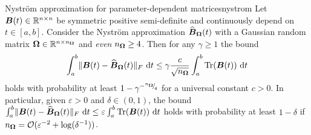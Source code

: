 \color{blue}

\begin{lemma}{Nyström approximation for parameter-dependent matrices}{nystrom}
    Let $\boldsymbol{B}(t) \in \mathbb{R}^{n \times n}$ be symmetric positive semi-definite and continuously depend on $t \in [a, b]$. Consider the Nyström approximation $\widehat{\boldsymbol{B}}_{\boldsymbol{\Omega}}(t)$ with a Gaussian random matrix $\boldsymbol{\Omega} \in \mathbb{R}^{n \times n_{\boldsymbol{\Omega}}}$ and \emph{even} $n_{\boldsymbol{\Omega}} \geq 4$.
    Then for any $\gamma \geq 1$ the bound
    \begin{equation}
        \int_{a}^{b} \lVert \boldsymbol{B}(t) - \widehat{\boldsymbol{B}}_{\boldsymbol{\Omega}}(t) \rVert _F~\mathrm{d}t \leq \gamma \frac{c}{\sqrt{n_{\boldsymbol{\Omega}}}} \int_{a}^{b} \operatorname{Tr}(\boldsymbol{B}(t))~\mathrm{d}t
        \label{qu:nystrompp-theorem-bound}
    \end{equation}
        holds with probability at least $1 - \gamma^{-{}^{n_{\boldsymbol{\Omega}}}{\mskip -5mu/\mskip -3mu}_{4}}$ for 
        a universal constant $c > 0$. In particular, given $\varepsilon > 0$ and $\delta \in (0, 1)$, the bound $\int_{a}^{b} \lVert \boldsymbol{B}(t) - \widehat{\boldsymbol{B}}_{\boldsymbol{\Omega}}(t) \rVert _F~\mathrm{d}t \leq \varepsilon \int_{a}^{b} \operatorname{Tr}(\boldsymbol{B}(t))~\mathrm{d}t$ holds with probability at least $1-\delta$ if $n_{\boldsymbol{\Omega}} = \mathcal{O}(\varepsilon^{-2} + \log(\delta^{-1}))$.
\end{lemma}


